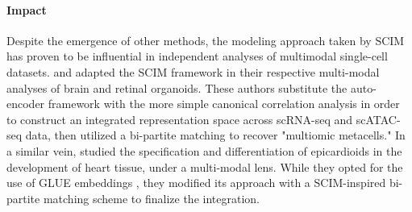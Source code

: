 \paragraph{Impact} Despite the emergence of other methods, the modeling approach taken by SCIM has proven to be influential in independent analyses of multimodal single-cell datasets. 
\citeauthor{fleck2022} and \citeauthor{wahle2023} adapted the SCIM framework in their respective multi-modal analyses of brain and retinal organoids.
These authors substitute the auto-encoder framework with the more simple canonical correlation analysis in order to construct an integrated representation space across scRNA-seq and scATAC-seq data, then utilized a bi-partite matching to recover "multiomic metacells."
In a similar vein, \citeauthor{meier2023} studied the specification and differentiation of epicardioids in the development of heart tissue, under a multi-modal lens.
While they opted for the use of GLUE embeddings \cite{cao2022}, they modified its approach with a SCIM-inspired bi-partite matching scheme to finalize the integration.
